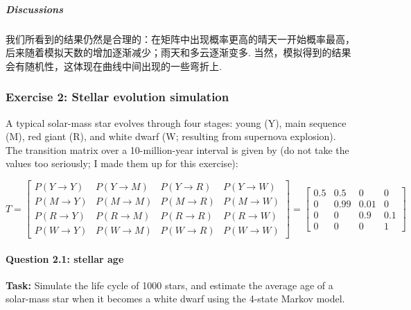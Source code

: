 \documentclass[11pt]{article}
\begin{document}
    \subparagraph{Discussions}\label{discussions}

我们所看到的结果仍然是合理的：在矩阵中出现概率更高的晴天一开始概率最高，后来随着模拟天数的增加逐渐减少；雨天和多云逐渐变多.
当然，模拟得到的结果会有随机性，这体现在曲线中间出现的一些弯折上.

    \subsubsection{Exercise 2: Stellar evolution
simulation}\label{exercise-2-stellar-evolution-simulation}

A typical solar-mass star evolves through four stages: young (Y), main
sequence (M), red giant (R), and white dwarf (W; resulting from
supernova explosion). The transition matrix over a 10-million-year
interval is given by (do not take the values too seriously; I made them
up for this exercise):

\[
T = \begin{bmatrix}
P(Y \to Y) & P(Y \to M) & P(Y \to R) & P(Y \to W) \\
P(M \to Y) & P(M \to M) & P(M \to R) & P(M \to W) \\
P(R \to Y) & P(R \to M) & P(R \to R) & P(R \to W) \\
P(W \to Y) & P(W \to M) & P(W \to R) & P(W \to W)
\end{bmatrix}
= \begin{bmatrix}
0.5 & 0.5 & 0 & 0 \\
0 & 0.99 & 0.01 & 0 \\
0 & 0 & 0.9 & 0.1 \\
0 & 0 & 0 & 1
\end{bmatrix}
\]

\paragraph{Question 2.1: stellar age}\label{question-2.1-stellar-age}

\textbf{Task:} Simulate the life cycle of 1000 stars, and estimate the
average age of a solar-mass star when it becomes a white dwarf using the
4-state Markov model.
\end{document}
